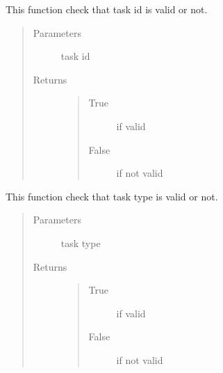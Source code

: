 \documentclass[letterpaper,10pt,english]{sphinxmanual}
\begin{document}

\begin{fulllineitems}
\label{\detokenize{janta:janta.viewhelper.is_task_id}}
This function check that task id is valid or not.
\begin{quote}\begin{description}
\item[{Parameters}] \leavevmode
{} \textendash{} task id

\item[{Returns}] \leavevmode
\begin{quote}\begin{description}
\item[{True}] \leavevmode
if valid

\item[{False}] \leavevmode
if not valid

\end{description}\end{quote}


\end{description}\end{quote}

\end{fulllineitems}


\begin{fulllineitems}
\label{\detokenize{janta:janta.viewhelper.is_task_type}}
This function check that task type is valid or not.
\begin{quote}\begin{description}
\item[{Parameters}] \leavevmode
{} \textendash{} task type

\item[{Returns}] \leavevmode
\begin{quote}\begin{description}
\item[{True}] \leavevmode
if valid

\item[{False}] \leavevmode
if not valid

\end{description}\end{quote}


\end{description}\end{quote}

\end{fulllineitems}
\end{document}
